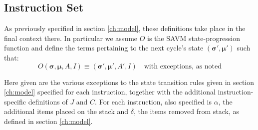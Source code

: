\documentclass[9pt,oneside]{amsart}
\begin{document}
\subsection{Instruction Set}
\label{subsec:instruction-set}

As previously specified in section \ref{ch:model}, these definitions take place in the final context there. In particular we assume $O$ is the SAVM state-progression function and define the terms pertaining to the next cycle's state $(\boldsymbol{\sigma}', \boldsymbol{\mu}')$ such that:
\begin{equation}
O(\boldsymbol{\sigma}, \boldsymbol{\mu}, A, I) \equiv (\boldsymbol{\sigma}', \boldsymbol{\mu}', A', I) \quad \text{with exceptions, as noted}
\end{equation}

Here given are the various exceptions to the state transition rules given in section \ref{ch:model} specified for each instruction, together with the additional instruction-specific definitions of $J$ and $C$. For each instruction, also specified is $\alpha$, the additional items placed on the stack and $\delta$, the items removed from stack, as defined in section \ref{ch:model}.
\end{document}
